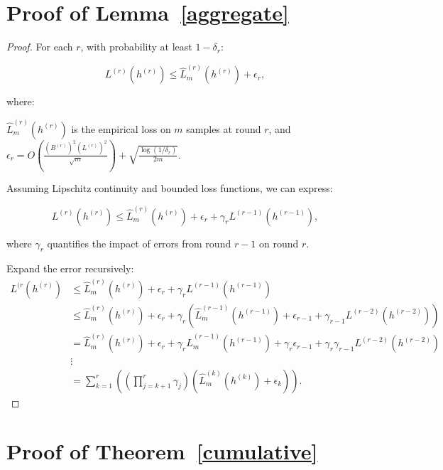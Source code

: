 \section{Proof of Lemma~\ref{aggregate}}\label{appendix:aggragate}
\begin{proof}
For each \( r \), with probability at least \( 1 - \delta_r \):

\[
L^{(r)}(h^{(r)}) \leq \hat{L}_m^{(r)}(h^{(r)}) + \epsilon_r,
\]

where:

\( \hat{L}_m^{(r)}(h^{(r)}) \) is the empirical loss on \( m \) samples at round \( r \), and \( \epsilon_r = O\left( \frac{(B^{(r)})^2 (L^{(r)})^2}{\sqrt{m}} \right) + \sqrt{ \frac{\log(1/\delta_r)}{2 m} } \).

Assuming Lipschitz continuity and bounded loss functions, we can express:

\[
L^{(r)}(h^{(r)}) \leq \hat{L}_m^{(r)}(h^{(r)}) + \epsilon_r + \gamma_r L^{(r-1)}(h^{(r-1)}),
\]

where \( \gamma_r \) quantifies the impact of errors from round \( r-1 \) on round \( r \).

Expand the error recursively:
\[
\begin{aligned}
L^{(r}(h^{(r)}) &\leq \hat{L}_m^{(r)}(h^{(r)}) + \epsilon_r + \gamma_r L^{(r-1)}(h^{(r-1)}) \\
&\leq \hat{L}_m^{(r)}(h^{(r)}) + \epsilon_r + \gamma_r \left( \hat{L}_m^{(r-1)}(h^{(r-1)}) + \epsilon_{r-1} + \gamma_{r-1} L^{(r-2)}(h^{(r-2)}) \right) \\
&= \hat{L}_m^{(r)}(h^{(r)}) + \epsilon_r + \gamma_r \hat{L}_m^{(r-1)}(h^{(r-1)}) + \gamma_r \epsilon_{r-1} + \gamma_r \gamma_{r-1} L^{(r-2)}(h^{(r-2)}) \\
&\vdots \\
&= \sum_{k=1}^{r} \left( \left( \prod_{j=k+1}^{r} \gamma_j \right) \left( \hat{L}_m^{(k)}(h^{(k)}) + \epsilon_k \right) \right).
\end{aligned}
\]
\end{proof}
\section{Proof of Theorem~\ref{cumulative}}\label{appendix:cumulative}


